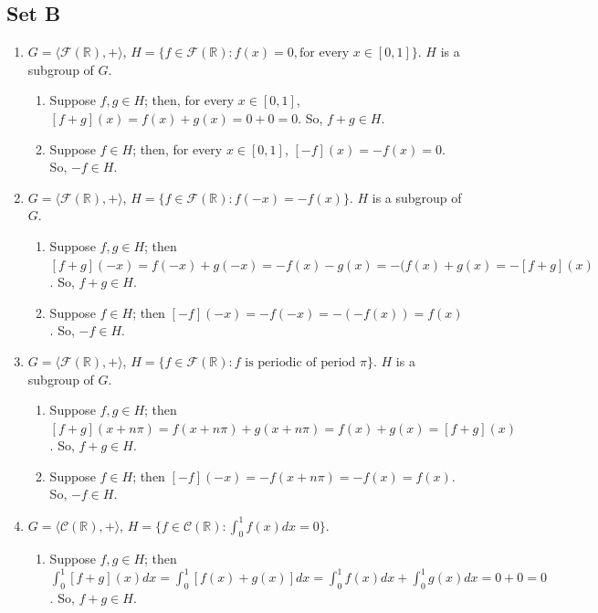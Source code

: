 \documentclass{article}
\begin{document}
\subsection{Set B}
\begin{enumerate}
    \item $G = \langle \mathscr{F}(\mathbb{R}), + \rangle$, $H = \{f \in \mathscr{F}(\mathbb{R}): f(x) = 0, \text{for every $x \in [0, 1]$}\}$. $H$ is a subgroup of $G$.
        \begin{enumerate}[label=(\roman*)]
            \item Suppose $f, g \in H$; then, for every $x \in [0, 1]$, $[f + g](x) = f(x) + g(x) = 0 + 0 = 0$. So, $f + g \in H$.
            \item Suppose $f \in H$; then, for every $x \in [0, 1]$, $[-f](x) = -f(x) = 0$. So, $-f \in H$.
        \end{enumerate}
        \item $G = \langle \mathscr{F}(\mathbb{R}), + \rangle$, $H = \{f \in \mathscr{F}(\mathbb{R}): f(-x) = -f(x)\}$. $H$ is a subgroup of $G$.
            \begin{enumerate}[label=(\roman*)]
                \item Suppose $f, g \in H$; then $[f + g](-x) = f(-x) + g(-x) = -f(x) - g(x) = -(f(x) + g(x) = -[f + g](x)$. So, $f + g \in H$.
                \item Suppose $f \in H$; then $[-f](-x) = -f(-x) = -(-f(x)) = f(x)$. So, $-f \in H$.
            \end{enumerate}    
        \item $G = \langle \mathscr{F}(\mathbb{R}), + \rangle$, $H = \{f \in \mathscr{F}(\mathbb{R}): \text{$f$ is periodic of period $\pi$}\}$. $H$ is a subgroup of $G$.
            \begin{enumerate}[label=(\roman*)]
                \item Suppose $f, g \in H$; then $[f + g](x + n\pi) = f(x + n\pi) + g(x + n\pi) = f(x) + g(x) = [f + g](x)$. So, $f + g \in H$.
                \item Suppose $f \in H$; then $[-f](-x) = -f(x + n\pi) = -f(x) = f(x)$. So, $-f \in H$.
            \end{enumerate}    
        \item $G = \langle \mathscr{C}(\mathbb{R}), +\rangle$, $H = \{f \in \mathscr{C}(\mathbb{R}): \int_0^1 f(x)dx = 0\}$.
            \begin{enumerate}[label=(\roman*)]
                \item Suppose $f, g \in H$; then $\int_0^1[f + g](x)dx = \int_0^1[f(x) + g(x)]dx = \int_0^1 f(x)dx + \int_0^1 g(x)dx = 0 + 0 = 0$.  So, $f + g \in H$.

\end{enumerate}
\end{enumerate}
\end{document}
